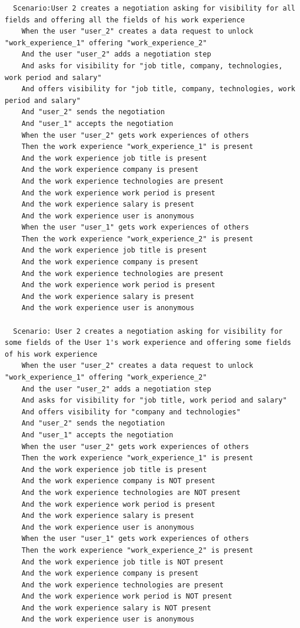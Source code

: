 \documentclass[a4paper, 12pt]{book}
\begin{document}
{\begin{verbatim}
  Scenario:User 2 creates a negotiation asking for visibility for all fields and offering all the fields of his work experience
    When the user "user_2" creates a data request to unlock "work_experience_1" offering "work_experience_2"
    And the user "user_2" adds a negotiation step
    And asks for visibility for "job title, company, technologies, work period and salary"
    And offers visibility for "job title, company, technologies, work period and salary"
    And "user_2" sends the negotiation
    And "user_1" accepts the negotiation
    When the user "user_2" gets work experiences of others
    Then the work experience "work_experience_1" is present
    And the work experience job title is present
    And the work experience company is present
    And the work experience technologies are present
    And the work experience work period is present
    And the work experience salary is present
    And the work experience user is anonymous
    When the user "user_1" gets work experiences of others
    Then the work experience "work_experience_2" is present
    And the work experience job title is present
    And the work experience company is present
    And the work experience technologies are present
    And the work experience work period is present
    And the work experience salary is present
    And the work experience user is anonymous

  Scenario: User 2 creates a negotiation asking for visibility for some fields of the User 1's work experience and offering some fields of his work experience
    When the user "user_2" creates a data request to unlock "work_experience_1" offering "work_experience_2"
    And the user "user_2" adds a negotiation step
    And asks for visibility for "job title, work period and salary"
    And offers visibility for "company and technologies"
    And "user_2" sends the negotiation
    And "user_1" accepts the negotiation
    When the user "user_2" gets work experiences of others
    Then the work experience "work_experience_1" is present
    And the work experience job title is present
    And the work experience company is NOT present
    And the work experience technologies are NOT present
    And the work experience work period is present
    And the work experience salary is present
    And the work experience user is anonymous
    When the user "user_1" gets work experiences of others
    Then the work experience "work_experience_2" is present
    And the work experience job title is NOT present
    And the work experience company is present
    And the work experience technologies are present
    And the work experience work period is NOT present
    And the work experience salary is NOT present
    And the work experience user is anonymous


        \end{verbatim}
    }
\end{document}

